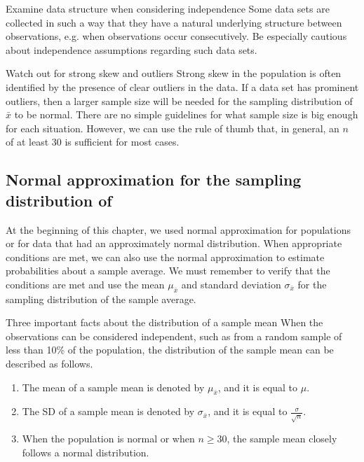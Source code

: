 \begin{onebox}{Examine data structure when considering independence}
{Some data sets are collected in such a way that they have a natural underlying structure between observations, e.g. when observations occur consecutively. Be especially cautious about independence assumptions regarding such data sets.}
\end{onebox}

\begin{onebox}{Watch out for strong skew and outliers}
{Strong skew in the population is often identified by the presence of clear outliers in the data. If a data set has prominent outliers, then a larger sample size will be needed for the sampling distribution of $\bar{x}$ to be normal. There are no simple guidelines for what sample size is big enough for each situation. However, we can use the rule of thumb that, in general, an $n$ of at least 30 is sufficient for most cases.}
\end{onebox}


\D{\newpage}

\subsection[Normal approximation for the sampling distribution of $\bar{x}$]{Normal approximation for the sampling distribution of }

At the beginning of this chapter, we used normal approximation for populations or for data that had an approximately normal distribution. When appropriate conditions are met, we can also use the normal approximation to estimate probabilities about a sample average. We must remember to verify that the conditions are met and use the mean $\mu_{\bar{x}}$ and standard deviation $\sigma_{\bar{x}}$ for the sampling distribution of the sample average.

\begin{onebox}{Three important facts about the distribution of a sample mean }
When the observations can be considered independent, such as from a random sample of less than 10\% of the population, the distribution of the sample mean can be described as follows.\begin{enumerate}
\setlength{\itemsep}{0mm}
\item The mean of a sample mean is denoted by $\mu_{\bar{x}}$, and it is equal to $\mu$.
\item The SD of a sample mean is denoted by $\sigma_{\bar{x}}$, and it is equal to $\frac{\sigma}{\sqrt{n}}$.
\item When the population is normal or when $n\ge 30$, the sample mean closely follows a normal distribution. 
\end{enumerate}\end{onebox}

